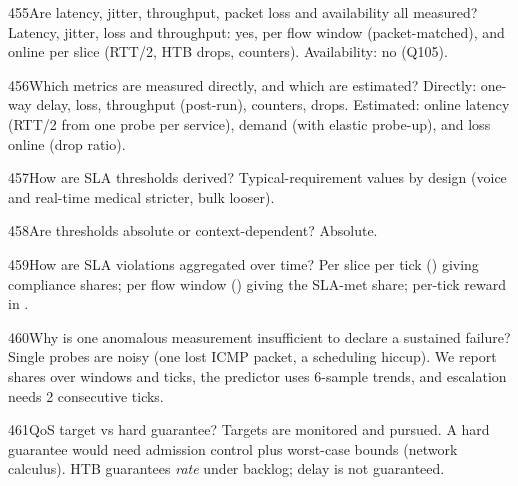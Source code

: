 \begin{qa}{455}{Are latency, jitter, throughput, packet loss and availability all measured?}
Latency, jitter, loss and throughput: yes, per flow window (packet-matched), and online per slice (RTT/2, HTB drops,
counters). Availability: no (Q105).
\end{qa}

\begin{qa}{456}{Which metrics are measured directly, and which are estimated?}
Directly: one-way delay, loss, throughput (post-run), counters, drops. Estimated: online latency (RTT/2 from one probe
per service), demand (with elastic probe-up), and loss online (drop ratio).
\end{qa}

\begin{qa}{457}{How are SLA thresholds derived?}
Typical-requirement values by design (voice and real-time medical stricter, bulk looser).
\end{qa}

\begin{qa}{458}{Are thresholds absolute or context-dependent?}
Absolute.
\end{qa}

\begin{qa}{459}{How are SLA violations aggregated over time?}
Per slice per tick () giving compliance shares; per flow window () giving the
SLA-met share; per-tick reward in .
\end{qa}

\begin{qa}{460}{Why is one anomalous measurement insufficient to declare a sustained failure?}
Single probes are noisy (one lost ICMP packet, a scheduling hiccup). We report shares over windows and ticks, the
predictor uses 6-sample trends, and escalation needs 2 consecutive ticks.
\end{qa}

\begin{qa}{461}{QoS target vs hard guarantee?}
Targets are monitored and pursued. A hard guarantee would need admission control plus worst-case bounds (network
calculus). HTB guarantees \emph{rate} under backlog; delay is not guaranteed.
\end{qa}

